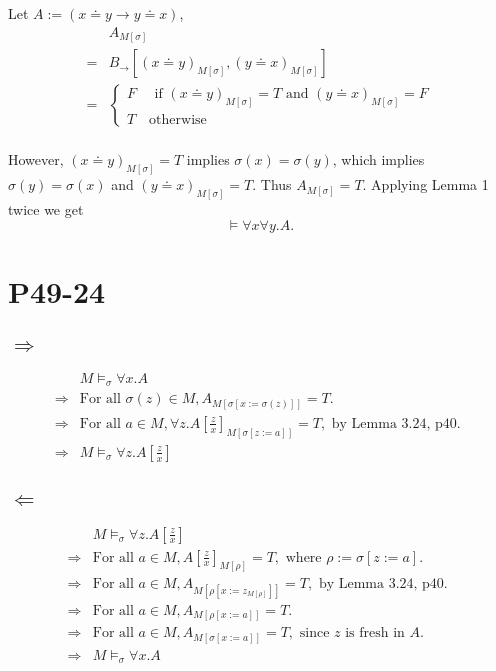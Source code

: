 \documentclass{article}
\begin{document}
Let $A := (x \doteq y \rightarrow y \doteq x)$, 
\begin{align*}
	 &A_{M[\sigma]}\\
	=&B_\rightarrow[(x \doteq y)_{M[\sigma]}, (y \doteq x) _{M[\sigma]}]\\
	=&\begin{cases}
		F \quad \mbox{ if } (x \doteq y)_{M[\sigma]} = T \mbox{ and } (y \doteq x)_{M[\sigma]} = F\\
		T \quad \mbox{otherwise}%
	 \end{cases}\\
\end{align*}

However, $(x\doteq y)_{M[\sigma]} = T$ implies $\sigma(x) = \sigma(y)$, which implies $\sigma(y) = \sigma(x)$ and $(y \doteq x)_{M[\sigma]} = T$. Thus $A _{M[\sigma]} = T$. Applying Lemma 1 twice we get $$\models \forall x \forall y. A.$$ 

\section{P49-24}
\subsection*{$\Rightarrow$}
\begin{align*}
	& M\models _\sigma \forall x. A\\
	\Rightarrow & \text{For all }\sigma(z) \in M, A_{M[\sigma[x:=\sigma(z)]]} = T. \\
	\Rightarrow&\text{For all }a\in M, \forall z . A[\frac{z}{x}]_{M[\sigma[z:=a]]} = T, \text{ by Lemma 3.24, p40. } \\
	\Rightarrow &M\models _\sigma\forall z. A[\frac{z}{x}]
\end{align*}
\subsection*{$\Leftarrow$}
\begin{align*}
	 &M\models _\sigma\forall z. A[\frac{z}{x}]\\
	\Rightarrow & \text{For all }a \in M, A[\frac{z}{x}]_{M[\rho]} = T, \text{ where $\rho := \sigma[z:=a]$. } \\
	\Rightarrow & \text{For all }a \in M, A_{M[\rho[x := z_{M[\rho]}]]} = T, \text{ by Lemma 3.24, p40. } \\
	\Rightarrow & \text{For all }a \in M, A_{M[\rho[x:=a]]} = T. \\
	\Rightarrow & \text{For all }a \in M, A_{M[\sigma[x:=a]]} = T, \text{ since $z$ is fresh in $A$. } \\
	\Rightarrow & M\models _\sigma \forall x. A
\end{align*}
\end{document}
